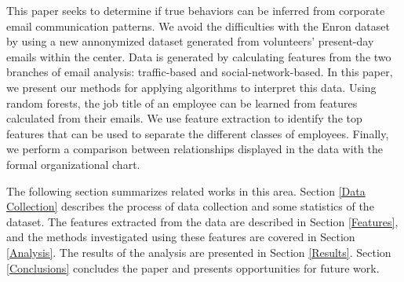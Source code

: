 \documentclass{article}
\begin{document}
This paper seeks to determine if true behaviors can be inferred from corporate email communication patterns.  We avoid the difficulties with the Enron dataset by using a new annonymized dataset generated from volunteers' present-day emails within the center.  Data is generated by calculating features from the two branches of email analysis: traffic-based and social-network-based. In this paper, we present our methods for applying algorithms to interpret this data.  Using random forests, the job title of an employee can be learned from features calculated from their emails.  We use feature extraction to identify the top features that can be used to separate the different classes of employees.  Finally, we perform a comparison between relationships displayed in the data with the formal organizational chart.  

The following section summarizes related works in this area.  Section \ref{Data Collection} describes the process of data collection and some statistics of the dataset.  The features extracted from the data are described in Section \ref{Features}, and the methods investigated using these features are covered in Section \ref{Analysis}.  The results of the analysis are presented in Section \ref{Results}.  Section \ref{Conclusions} concludes the paper and presents opportunities for future work.  
\end{document}
